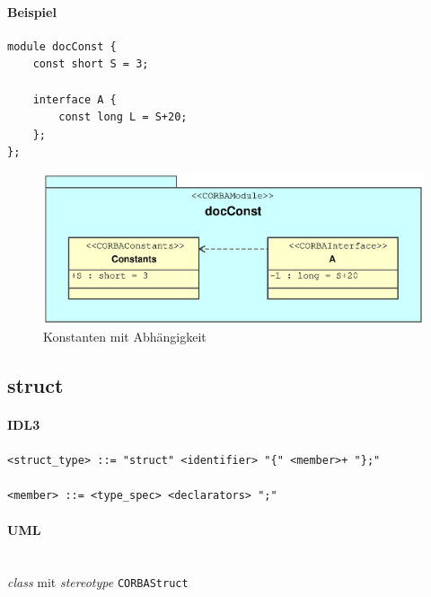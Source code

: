 \documentclass [a4paper,10pt] {scrartcl}
\begin{document}
\paragraph{Beispiel}
\begin{verbatim}
module docConst {
    const short S = 3;

    interface A {
        const long L = S+20;
    };
};
\end{verbatim}
\begin{figure}[!h]
\centerline{\includegraphics[width=\linewidth]{docConst.eps}}
\caption{Konstanten mit Abh{\"a}ngigkeit}
\label{fig:const}
\end{figure}

\cleardoublepage
\subsection{struct}
\paragraph{IDL3}
\begin{verbatim}
<struct_type> ::= "struct" <identifier> "{" <member>+ "};"

<member> ::= <type_spec> <declarators> ";"
\end{verbatim}
\paragraph{UML}~\\
\emph{class} mit \emph{stereotype} \texttt{CORBAStruct}\\
\end{document}
